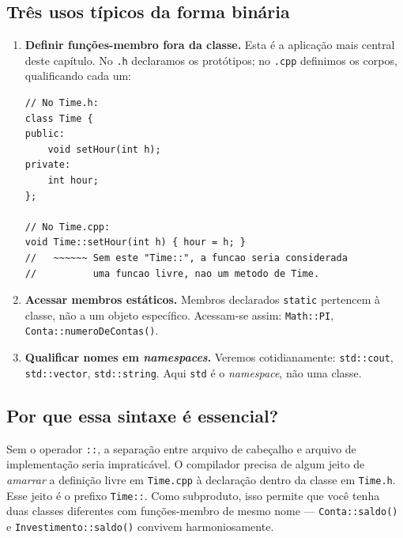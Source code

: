 \documentclass[11pt,a4paper]{article}
\begin{document}
\subsection*{Tr\^es usos t\'ipicos da forma bin\'aria}

\begin{enumerate}[leftmargin=*,itemsep=2pt]
  \item \textbf{Definir fun\c{c}\~oes-membro fora da classe.} Esta \'e a aplica\c{c}\~ao mais central deste cap\'itulo. No \texttt{.h} declaramos os prot\'otipos; no \texttt{.cpp} definimos os corpos, qualificando cada um:
    \begin{lstlisting}[style=cppcode,numbers=none]
// No Time.h:
class Time {
public:
    void setHour(int h);
private:
    int hour;
};

// No Time.cpp:
void Time::setHour(int h) { hour = h; }
//   ~~~~~~ Sem este "Time::", a funcao seria considerada
//          uma funcao livre, nao um metodo de Time.
    \end{lstlisting}

  \item \textbf{Acessar membros est\'aticos.} Membros declarados \texttt{static} pertencem \`a classe, n\~ao a um objeto espec\'ifico. Acessam-se assim: \texttt{Math::PI}, \texttt{Conta::numeroDeContas()}.

  \item \textbf{Qualificar nomes em \emph{namespaces}.} Veremos cotidianamente: \texttt{std::cout}, \texttt{std::vector}, \texttt{std::string}. Aqui \texttt{std} \'e o \emph{namespace}, n\~ao uma classe.
\end{enumerate}

\subsection*{Por que essa sintaxe \'e essencial?}

\begin{obseng}
Sem o operador \texttt{::}, a separa\c{c}\~ao entre arquivo de cabe\c{c}alho e arquivo de implementa\c{c}\~ao seria impratic\'avel. O compilador precisa de algum jeito de \emph{amarrar} a defini\c{c}\~ao livre em \texttt{Time.cpp} \`a declara\c{c}\~ao dentro da classe em \texttt{Time.h}. Esse jeito \'e o prefixo \texttt{Time::}. Como subproduto, isso permite que voc\^e tenha duas classes diferentes com fun\c{c}\~oes-membro de mesmo nome --- \texttt{Conta::saldo()} e \texttt{Investimento::saldo()} convivem harmoniosamente.
\end{obseng}
\end{document}
